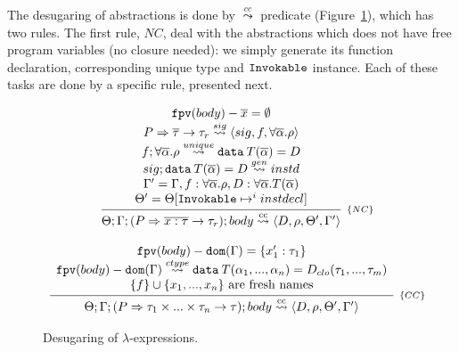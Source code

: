 \documentclass[a4paper, 11pt]{article}
\theoremstyle{definition}
\begin{document}
The desugaring of abstractions is done by $\overset{cc}{\leadsto}$ predicate (Figure~\ref{fig:closurepred}),
which has two rules. The first rule, $NC$, deal with the abstractions which does not
have free program variables (no closure needed): we simply generate its
function declaration, corresponding unique type and $\mathtt{Invokable}$ instance. Each of these
tasks are done by a specific rule, presented next.

\begin{figure}[H]
  \[
    \begin{array}{c}
      \infer[_{\{NC\}}]
            {\Theta;\Gamma;(P \Rightarrow \overline{x : \tau} \to \tau_r); body \cc \langle D, \rho, \Theta', \Gamma' \rangle}
            {\begin{array}{c}
              \fpv(body) - \overline{x} = \emptyset\\
              P \Rightarrow \overline{\tau} \to \tau_r \sig \langle sig, f, \forall \overline{\alpha} . \rho \rangle\\
              f ; \forall \overline{\alpha}. \rho \unique \mathtt{data}\:T(\overline{\alpha}) = D\\
              sig ; \mathtt{data}\:T(\overline{\alpha}) = D \geninvoke instd\\
              \Gamma' = \Gamma, f : \forall\overline{\alpha}.\rho, D : \forall\overline{\alpha} . T(\overline{\alpha})\\
              \Theta' = \Theta [\invokable \mapsto^i instdecl]
             \end{array}}
 \\ \\
      \infer[_{\{CC\}}]
            {\Theta;\Gamma;(P \Rightarrow \tau_1\times ... \times \tau_n \to \tau); body \cc \langle D, \rho, \Theta', \Gamma' \rangle}
            {\begin{array}{c}
              \fpv(body) - \dom{\Gamma} = \{x'_1 : \tau_1\}\\
              \fpv(body) - \dom{\Gamma} \closuretype \mathtt{data}\:T(\alpha_1,...,\alpha_n) = D_{clo}(\tau_1,...,\tau_m)\\
              \{f\}\cup \{x_1, ..., x_n\}\text{ are fresh names} \\
             \end{array}}
    \end{array}
  \]
  \centering
  \caption{Desugaring of $\lambda$-expressions.}
  \label{fig:closurepred}
\end{figure}
\end{document}
